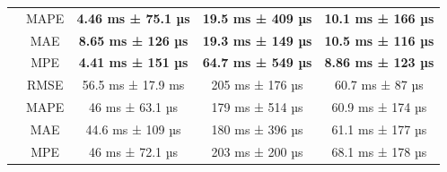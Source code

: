 \begin{table}[!htp]
\begin{tabular}{|c|c|ccc|}
        \rowcolor[HTML]{EFEFEF}
        \cellcolor[HTML]{C0C0C0}                          & MAPE                                              & \multicolumn{1}{c|}{\cellcolor[HTML]{EFEFEF}\textbf{4.46 ms ± 75.1 µs}} & \multicolumn{1}{c|}{\cellcolor[HTML]{EFEFEF}\textbf{19.5 ms ± 409 µs}} & \textbf{10.1 ms ± 166 µs} \\ \cline{2-5}
        \cellcolor[HTML]{C0C0C0}                          & MAE                                               & \multicolumn{1}{c|}{\textbf{8.65 ms ± 126 µs}}                          & \multicolumn{1}{c|}{\textbf{19.3 ms ± 149 µs}}                         & \textbf{10.5 ms ± 116 µs} \\ \cline{2-5}
        \rowcolor[HTML]{EFEFEF}
        \multirow{-4}{*}{\cellcolor[HTML]{C0C0C0}ReW}     & MPE                                               & \multicolumn{1}{c|}{\cellcolor[HTML]{EFEFEF}\textbf{4.41 ms ± 151 µs}}  & \multicolumn{1}{c|}{\cellcolor[HTML]{EFEFEF}\textbf{64.7 ms ± 549 µs}} & \textbf{8.86 ms ± 123 µs} \\ \hline
        \cellcolor[HTML]{C0C0C0}                          & RMSE                                              & \multicolumn{1}{c|}{56.5 ms ± 17.9 ms}                                  & \multicolumn{1}{c|}{205 ms ± 176 µs}                                   & 60.7 ms ± 87 µs           \\ \cline{2-5}
        \rowcolor[HTML]{EFEFEF}
        \cellcolor[HTML]{C0C0C0}                          & MAPE                                              & \multicolumn{1}{c|}{\cellcolor[HTML]{EFEFEF}46 ms ± 63.1 µs}            & \multicolumn{1}{c|}{\cellcolor[HTML]{EFEFEF}179 ms ± 514 µs}           & 60.9 ms ± 174 µs          \\ \cline{2-5}
        \cellcolor[HTML]{C0C0C0}                          & MAE                                               & \multicolumn{1}{c|}{44.6 ms ± 109 µs}                                   & \multicolumn{1}{c|}{180 ms ± 396 µs}                                   & 61.1 ms ± 177 µs          \\ \cline{2-5}
        \rowcolor[HTML]{EFEFEF}
        \multirow{-4}{*}{\cellcolor[HTML]{C0C0C0}Prophet} & MPE                                               & \multicolumn{1}{c|}{\cellcolor[HTML]{EFEFEF}46 ms ± 72.1 µs}            & \multicolumn{1}{c|}{\cellcolor[HTML]{EFEFEF}203 ms ± 200 µs}           & 68.1 ms ± 178 µs          \\ \hline
    \end{tabular}
\end{table}

